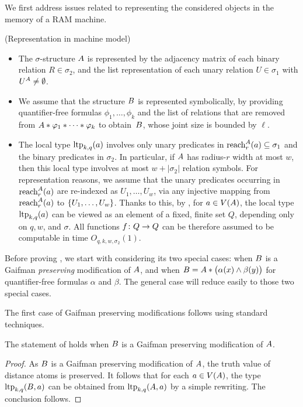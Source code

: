 We first address issues related to representing the considered objects 
in the memory of a RAM machine.
\begin{remark}(Representation in machine model)\label{rem:representation}
\begin{itemize}
    \item The $\sigma$-structure ${{A}}$ is represented by 
  the adjacency matrix of each binary relation $R\in\sigma_2$,
  and the list representation of each unary relation $U\in \sigma_1$ with $U^{{A}}\neq\emptyset$.
\item 
We assume that the structure ${{B}}$ is represented symbolically,
by providing quantifier-free formulas $\phi_1,\ldots,\phi_k$ 
and the list of relations that are removed from ${{A}}\ast\varphi_1\ast\cdots\ast\varphi_k$ to obtain~${{B}}$, whose joint size is bounded by $\ell$.
\item
  The local type $\textnormal{ltp}_{k,q}(a)$ involves only unary predicates 
in ${\rm reach}_{r}^{{{A}}}(a)\subseteq \sigma_1$
and the binary predicates in $\sigma_2$.
In particular, if ${{A}}$ has radius-$r$ width at most $w$,
then this local type involves at most $w+|\sigma_2|$ relation symbols.
For representation reasons, we assume that 
the unary predicates occurring in ${\rm reach}_r^{{{A}}}(a)$ are 
re-indexed as $U_1,\ldots,U_w$, via any injective mapping from ${\rm reach}_r^{{{A}}}(a)$
to $\{U_1,\ldots,U_w\}$.
Thanks to this, by ,
for $a\in V({{A}})$, the local type $\textnormal{ltp}_{k,q}(a)$ can be viewed as an element of a fixed, finite set $Q$,
depending only on $q,w$, and $\sigma$. All functions $f\colon Q\to Q$ can be therefore assumed to be computable in time $O_{q,k,w,\sigma_2}(1)$.
\end{itemize}
\end{remark}






\medskip
Before proving ,
we start with considering its two special cases:
when ${{B}}$ is a Gaifman \emph{preserving} modification of ${{A}}$,
and when ${{B}}={{A}}\ast\bigl(\alpha(x)\land \beta(y)\bigr)$
for quantifier-free formulas $\alpha$ and $\beta$.
The general case will reduce easily to those two special cases.

The first case of Gaifman preserving modifications follows using standard techniques.

\begin{lemma}\label{lem:reduct}
The statement of   holds when ${{B}}$ is a Gaifman preserving modification of ${{A}}$.
  \end{lemma}
  \begin{proof}
    As ${{B}}$ is a Gaifman preserving modification of ${{A}}$, the truth value of distance atoms is preserved.
It follows that for each $a\in V({{A}})$, the type
  $\textnormal{ltp}_{k,q}({{B}},a)$ can be obtained from $\textnormal{ltp}_{k,q}({{A}},a)$ by a simple rewriting.
  The conclusion follows.
  \end{proof}

